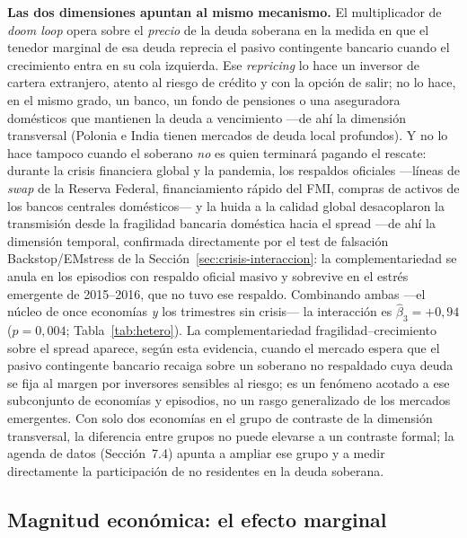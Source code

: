 \textbf{Las dos dimensiones apuntan al mismo mecanismo.} El multiplicador de \textit{doom loop} opera sobre el \emph{precio} de la deuda soberana en la medida en que el tenedor marginal de esa deuda reprecia el pasivo contingente bancario cuando el crecimiento entra en su cola izquierda. Ese \textit{repricing} lo hace un inversor de cartera extranjero, atento al riesgo de crédito y con la opción de salir; no lo hace, en el mismo grado, un banco, un fondo de pensiones o una aseguradora domésticos que mantienen la deuda a vencimiento —de ahí la dimensión transversal (Polonia e India tienen mercados de deuda local profundos). Y no lo hace tampoco cuando el soberano \emph{no} es quien terminará pagando el rescate: durante la crisis financiera global y la pandemia, los respaldos oficiales —líneas de \textit{swap} de la Reserva Federal, financiamiento rápido del FMI, compras de activos de los bancos centrales domésticos— y la huida a la calidad global desacoplaron la transmisión desde la fragilidad bancaria doméstica hacia el spread —de ahí la dimensión temporal, confirmada directamente por el test de falsación Backstop/EMstress de la Sección~\ref{sec:crisis-interaccion}: la complementariedad se anula en los episodios con respaldo oficial masivo y sobrevive en el estrés emergente de 2015--2016, que no tuvo ese respaldo. Combinando ambas —el núcleo de once economías \emph{y} los trimestres sin crisis— la interacción es $\hat\beta_3=+0{,}94$ ($p=0{,}004$; Tabla~\ref{tab:hetero}). La complementariedad fragilidad--crecimiento sobre el spread aparece, según esta evidencia, cuando el mercado espera que el pasivo contingente bancario recaiga sobre un soberano no respaldado cuya deuda se fija al margen por inversores sensibles al riesgo; es un fenómeno acotado a ese subconjunto de economías y episodios, no un rasgo generalizado de los mercados emergentes. Con solo dos economías en el grupo de contraste de la dimensión transversal, la diferencia entre grupos no puede elevarse a un contraste formal; la agenda de datos (Sección~7.4) apunta a ampliar ese grupo y a medir directamente la participación de no residentes en la deuda soberana.

\subsection{Magnitud económica: el efecto marginal}

